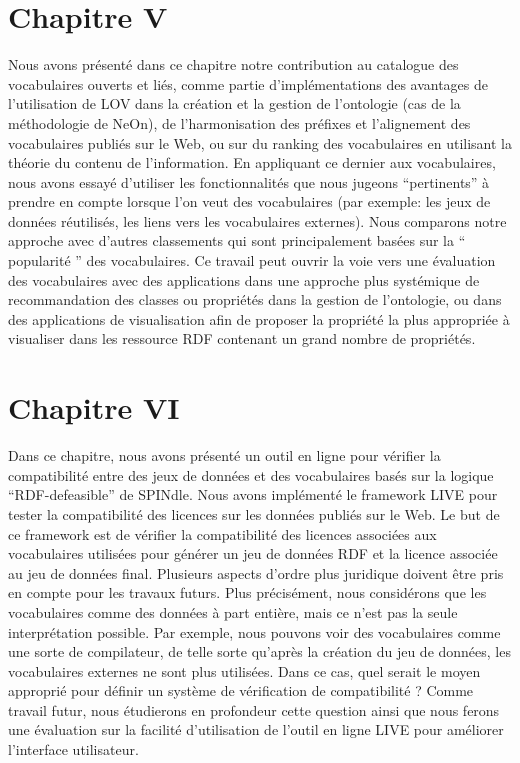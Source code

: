 \documentclass[a4paper,11pt,twoside]{report}
\begin{document}
\section*{Chapitre V}
Nous avons présenté dans ce chapitre notre contribution au catalogue des vocabulaires ouverts et liés, comme partie d'implémentations des avantages de l'utilisation de LOV dans la création et la gestion de l'ontologie (cas de la méthodologie de NeOn), de l'harmonisation des préfixes et l'alignement des vocabulaires publiés sur le Web, ou sur du ranking des vocabulaires en utilisant la théorie du contenu de l'information. En appliquant ce dernier aux vocabulaires, nous avons essayé d'utiliser les fonctionnalités que nous jugeons ``pertinents''  à prendre en compte lorsque l'on veut des vocabulaires (par exemple: les jeux de données réutilisés, les liens vers les vocabulaires externes). Nous comparons notre approche avec d'autres classements qui sont principalement basées sur la `` popularité '' des vocabulaires. Ce travail peut ouvrir la voie vers une évaluation des vocabulaires avec des applications dans une approche plus systémique de recommandation des classes ou propriétés dans la gestion de l'ontologie, ou dans des applications de visualisation afin de proposer la  propriété la plus appropriée à visualiser dans les ressource RDF contenant un grand nombre de propriétés.

\section*{Chapitre VI}
Dans ce chapitre, nous avons présenté un outil en ligne pour vérifier la compatibilité entre des jeux de données et des vocabulaires basés sur la logique ``RDF-defeasible'' de SPINdle. Nous avons implémenté le framework LIVE pour tester la compatibilité des licences sur les données publiés sur le Web. Le but de ce framework est de vérifier la compatibilité des licences associées aux vocabulaires utilisées pour générer un jeu de données RDF et la licence associée au jeu de données final. Plusieurs aspects d'ordre plus juridique doivent être pris en compte pour les travaux futurs. Plus précisément, nous considérons que les vocabulaires comme des données à part entière, mais ce n'est pas la seule interprétation possible. Par exemple, nous pouvons voir des vocabulaires comme une sorte de compilateur, de telle sorte qu'après la création du jeu de données, les vocabulaires externes ne sont plus utilisées. Dans ce cas, quel serait le moyen approprié pour définir un système de vérification de compatibilité ? Comme travail futur, nous étudierons en profondeur cette question ainsi que nous ferons une évaluation sur la facilité d'utilisation de l'outil en ligne LIVE pour améliorer l'interface utilisateur.
\end{document}
